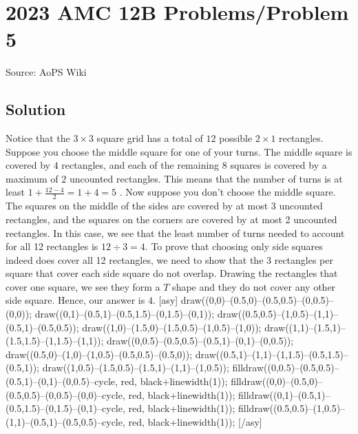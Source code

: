 \documentclass[12pt]{article}
\begin{document}
\section*{{2023 AMC 12B Problems/Problem 5}}
Source: AoPS Wiki

\subsection*{Solution}
Notice that the $3\times3$ square grid has a total of $12$ possible $2\times1$ rectangles. Suppose you choose the middle square for one of your turns. The middle square is covered by $4$ rectangles, and each of the remaining $8$ squares is covered by a maximum of $2$ uncounted rectangles. This means that the number of turns is at least $1+\frac{12-4}{2}=1+4=5$ . Now suppose you don't choose the middle square. The squares on the middle of the sides are covered by at most 3 uncounted rectangles, and the squares on the corners are covered by at most 2 uncounted rectangles. In this case, we see that the least number of turns needed to account for all 12 rectangles is $12\div 3=4.$ To prove that choosing only side squares indeed does cover all 12 rectangles, we need to show that the 3 rectangles per square that cover each side square do not overlap. Drawing the rectangles that cover one square, we see they form a $T$ shape and they do not cover any other side square. Hence, our answer is $4.$ [asy] draw((0,0)--(0.5,0)--(0.5,0.5)--(0,0.5)--(0,0)); draw((0,1)--(0.5,1)--(0.5,1.5)--(0,1.5)--(0,1)); draw((0.5,0.5)--(1,0.5)--(1,1)--(0.5,1)--(0.5,0.5)); draw((1,0)--(1.5,0)--(1.5,0.5)--(1,0.5)--(1,0)); draw((1,1)--(1.5,1)--(1.5,1.5)--(1,1.5)--(1,1)); draw((0,0.5)--(0.5,0.5)--(0.5,1)--(0,1)--(0,0.5)); draw((0.5,0)--(1,0)--(1,0.5)--(0.5,0.5)--(0.5,0)); draw((0.5,1)--(1,1)--(1,1.5)--(0.5,1.5)--(0.5,1)); draw((1,0.5)--(1.5,0.5)--(1.5,1)--(1,1)--(1,0.5)); filldraw((0,0.5)--(0.5,0.5)--(0.5,1)--(0,1)--(0,0.5)--cycle, red, black+linewidth(1)); filldraw((0,0)--(0.5,0)--(0.5,0.5)--(0,0.5)--(0,0)--cycle, red, black+linewidth(1)); filldraw((0,1)--(0.5,1)--(0.5,1.5)--(0,1.5)--(0,1)--cycle, red, black+linewidth(1)); filldraw((0.5,0.5)--(1,0.5)--(1,1)--(0.5,1)--(0.5,0.5)--cycle, red, black+linewidth(1)); [/asy]
\end{document}
